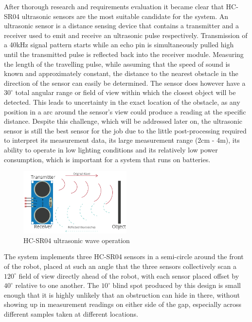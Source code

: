 After thorough research and requirements evaluation it became clear that HC-SR04 ultrasonic sensors are the most suitable candidate for the system. An ultrasonic sensor is a distance sensing device that contains a transmitter and a receiver used to emit and receive an ultrasonic pulse respectively. Transmission of a 40kHz signal pattern starts while an echo pin is simultaneously pulled high until the transmitted pulse is reflected back into the receiver module. Measuring the length of the travelling pulse, while assuming that the speed of sound is known and approximately constant, the distance to the nearest obstacle in the direction of the sensor can easily be determined. The sensor does however have a $30^\circ$ total angular range or field of view within which the closest object will be detected. This leads to uncertainty in the exact location of the obstacle, as any position in a arc around the sensor's view could produce a reading at the specific distance. Despite this challenge, which will be addressed later on, the ultrasonic sensor is still the best sensor for the job due to the little post-processing required to interpret its measurement data, its large measurement range (2cm - 4m), its ability to operate in low lighting conditions and its relatively low power consumption, which is important for a system that runs on batteries. \\

\begin{figure}[H]
    \centering
    \includegraphics[width=0.5\textwidth]{figures/hcsr04_waves.png}
    \caption{HC-SR04 ultrasonic wave operation}
    \label{fig:hcsr04_waves}
\end{figure}

The system implements three HC-SR04 sensors in a semi-circle around the front of the robot, placed at such an angle that the three sensors collectively scan a $120^\circ$ field of view directly ahead of the robot, with each sensor placed offset by $40^\circ$ relative to one another. The $10^\circ$ blind spot produced by this design is small enough that it is highly unlikely that an obstruction can hide in there, without showing up in measurement readings on either side of the gap, especially across different samples taken at different locations. \\


